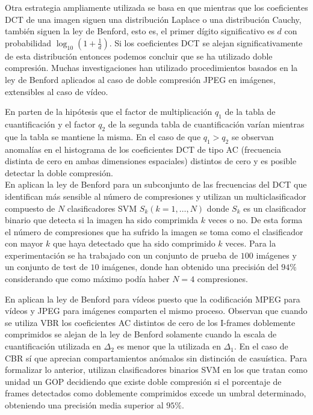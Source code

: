 Otra estrategia ampliamente utilizada se basa en que mientras que los coeficientes DCT de una imagen siguen una distribución Laplace\cite{reininger:1983} o una distribución Cauchy\cite{eggerton:1986}, también siguen la ley de Benford\cite{fu:2009}, esto es, el primer dígito significativo es $d$ con probabilidad $\log_{10}\left(1+\frac{1}{d}\right)$. Si los coeficientes DCT se alejan significativamente de esta distribución entonces podemos concluir que se ha utilizado doble compresión. Muchas investigaciones han utilizado procedimientos basados en la ley de Benford aplicados al caso de doble compresión JPEG en imágenes, extensibles al caso de vídeo. 

En \cite{wang:2009} parten de la hipótesis que el factor de multiplicación $q_1$ de la tabla de cuantificación y el factor $q_2$ de la segunda tabla de cuantificación varían mientras que la tabla se mantiene la misma. En el caso de que $q_1 > q_2$ se observan anomalías en el histograma de los coeficientes DCT de tipo AC (frecuencia distinta de cero en ambas dimensiones espaciales) distintos de cero y es posible detectar la doble compresión. \\

En \cite{milani:2012} aplican la ley de Benford para un subconjunto de las frecuencias del DCT que identifican más sensible al número de compresiones y utilizan un multiclasificador compuesto de $N$ clasificadores SVM $S_k (k=1, \dots, N)$ donde $S_k$ es un clasificador binario que detecta si la imagen ha sido comprimida $k$ veces o no. De esta forma el número de compresiones que ha sufrido la imagen se toma como el clasificador con mayor $k$ que haya detectado que ha sido comprimido $k$ veces. Para la experimentación se ha trabajado con un conjunto de prueba de $100$ imágenes y un conjunto de test de $10$ imágenes, donde han obtenido una precisión del $94\%$ considerando que como máximo podía haber $N=4$ compresiones.

En \cite{chen:2009} aplican la ley de Benford para vídeos puesto que la codificación MPEG para vídeos y JPEG para imágenes comparten el mismo proceso. Observan que cuando se utiliza VBR los coeficientes AC distintos de cero de los I-frames doblemente comprimidos se alejan de la ley de Benford solamente cuando la escala de cuantificación utilizada en $\Delta_2$ es menor que la utilizada en $\Delta_1$. En el caso de CBR sí que aprecian compartamientos anómalos sin distinción de casuística. Para formalizar lo anterior, utilizan clasificadores binarios SVM en los que tratan como unidad un GOP decidiendo que existe doble compresión si el porcentaje de frames detectados como doblemente comprimidos excede un umbral determinado, obteniendo una precisión media superior al $95\%$. \\

